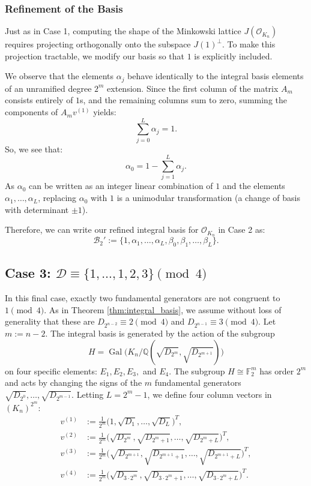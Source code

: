 \documentclass{amsart}
\newcommand{\Q}{\mathbb{Q}}
\newcommand{\F}{\mathbb{F}}
\theoremstyle{plain}
\theoremstyle{definition}
\theoremstyle{remark}
\numberwithin{equation}{section}
\begin{document}
\subsubsection*{Refinement of the Basis}

Just as in Case 1, computing the shape of the Minkowski lattice $J(\mathcal{O}_{K_n})$ requires projecting orthogonally onto the subspace $J(1)^\perp$. To make this projection tractable, we modify our basis so that $1$ is explicitly included. 

We observe that the elements $\alpha_j$ behave identically to the integral basis elements of an unramified degree $2^m$ extension. Since the first column of the matrix $A_m$ consists entirely of $1$s, and the remaining columns sum to zero, summing the components of $A_m v^{(1)}$ yields:
\[
    \sum_{j=0}^L \alpha_j = 1.
\]
So, we see that:
\[
    \alpha_0 = 1 - \sum_{j=1}^L \alpha_j.
\]
As $\alpha_0$ can be written as an integer linear combination of $1$ and the elements $\alpha_1, \ldots, \alpha_L$, replacing $\alpha_0$ with $1$ is a unimodular transformation (a change of basis with determinant $\pm 1$). 

Therefore, we can write our refined integral basis for $\mathcal{O}_{K_n}$ in Case 2 as:
\[
    \mathcal{B}_2' := \{1, \alpha_1, \ldots, \alpha_L, \beta_0, \beta_1, \ldots, \beta_L\}.
\]



\subsection*{Case 3: \texorpdfstring{$\mathcal{D} \equiv \{1, \ldots, 1, 2, 3\} \pmod 4$}{Case 3}}

In this final case, exactly two fundamental generators are not congruent to $1 \pmod 4$. As  in Theorem \ref{thm:integral_basis}, we assume without loss of generality that these are $D_{2^{n-2}} \equiv 2 \pmod 4$ and $D_{2^{n-1}} \equiv 3 \pmod 4$. Let $m:= n - 2$. The integral basis is generated by the action of the subgroup 
\[
    H = \operatorname{Gal}\bigl(K_n/\Q(\sqrt{D_{2^m}}, \sqrt{D_{2^{m+1}}})\bigr)
\]
on four specific elements: $E_1, E_2, E_3,$ and $E_4$. The subgroup $H \cong \F_2^m$ has order $2^m$ and acts  by changing the signs of the $m$ fundamental generators $\sqrt{D_{2^0}}, \ldots, \sqrt{D_{2^{m-1}}}$. 
Letting $L = 2^m - 1$, we define four column vectors in $(K_n)^{2^m}$:
\begin{align*}
    v^{(1)} &:= \frac{1}{2^m}\bigl(1, \sqrt{D_1}, \ldots, \sqrt{D_L}\bigr)^T, \\
    v^{(2)} &:= \frac{1}{2^m}\bigl(\sqrt{D_{2^m}}, \sqrt{D_{2^m+1}}, \ldots, \sqrt{D_{2^m+L}}\bigr)^T, \\
    v^{(3)} &:= \frac{1}{2^m}\bigl(\sqrt{D_{2^{m+1}}}, \sqrt{D_{2^{m+1}+1}}, \ldots, \sqrt{D_{2^{m+1}+L}}\bigr)^T, \\
    v^{(4)} &:= \frac{1}{2^m}\bigl(\sqrt{D_{3\cdot 2^m}}, \sqrt{D_{3\cdot 2^m+1}}, \ldots, \sqrt{D_{3\cdot 2^m+L}}\bigr)^T.
\end{align*}
\end{document}

